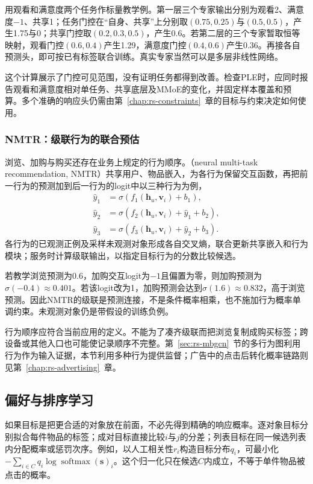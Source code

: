 用观看和满意度两个任务作标量教学例。第一层三个专家输出分别为观看2、满意度$-1$、共享1；任务门控在“自身、共享”上分别取$(0.75,0.25)$与$(0.5,0.5)$，产生1.75与0；共享门控取$(0.2,0.3,0.5)$，产生0.6。若第二层的三个专家暂取恒等映射，观看门控$(0.6,0.4)$产生1.29，满意度门控$(0.4,0.6)$产生0.36。再接各自预测头，即可按已有标签联合训练。真实专家当然可以是多层非线性网络。

这个计算展示了门控可见范围，没有证明任务都得到改善。检查PLE时，应同时报告观看和满意度相对单任务、共享底层及MMoE的变化，并固定样本覆盖和预算。多个准确的响应头仍需由第~\ref{chap:rs-constraints}~章的目标与约束决定如何使用。

\subsubsection{NMTR：级联行为的联合预估}
\label{sec:rs-nmtr}

浏览、加购与购买还存在业务上规定的行为顺序。（neural multi-task recommendation, NMTR）共享用户、物品嵌入，为各行为保留交互函数，再把前一行为的预测加到后一行为的logit中以三种行为为例，
\begin{align}
 \widehat y_1&=\sigma(f_1(\bm h_u,\bm v_i)+b_1),\\
 \widehat y_2&=\sigma(f_2(\bm h_u,\bm v_i)+\widehat y_1+b_2),\\
 \widehat y_3&=\sigma(f_3(\bm h_u,\bm v_i)+\widehat y_2+b_3).
 \label{eq:rs-nmtr}
\end{align}
各行为的已观测正例及采样未观测对象形成各自交叉熵，联合更新共享嵌入和行为模块；服务时计算级联输出，以指定目标行为的分数比较候选。

若教学浏览预测为0.6，加购交互logit为$-1$且偏置为零，则加购预测为$\sigma(-0.4)\approx0.401$。若该logit改为1，加购预测会达到$\sigma(1.6)\approx0.832$，高于浏览预测。因此NMTR的级联是预测连接，不是条件概率相乘，也不施加行为概率单调约束。未观测对象仍是带假设的训练负例。

行为顺序应符合当前应用的定义。不能为了凑齐级联而把浏览复制成购买标签；跨设备或其他入口也可能使记录顺序不完整。第~\ref{sec:rs-mbgcn}~节的多行为图利用行为作为输入证据，本节利用多种行为提供监督；广告中的点击后转化概率链路则见第~\ref{chap:rs-advertising}~章。

\subsection{偏好与排序学习}
\label{sec:rs-ranking-learning}

如果目标是把更合适的对象放在前面，不必先得到精确的响应概率。逐对象目标分别拟合每件物品的标签；成对目标直接比较$i$与$j$的分差；列表目标在同一候选列表内分配概率或惩罚次序。例如，以人工相关性$r_i$构造目标分布$q_i$，可最小化$-\sum_{i\in C}q_i\log\operatorname{softmax}(\bm s)_i$。这个归一化只在候选$C$内成立，不等于单件物品被点击的概率。

